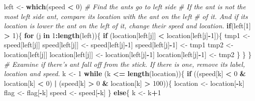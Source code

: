 \documentclass[]{article}
\newenvironment{Shaded}{\begin{snugshade}}{\end{snugshade}}
\newcommand{\KeywordTok}[1]{\textcolor[rgb]{0.13,0.29,0.53}{\textbf{#1}}}
\newcommand{\DecValTok}[1]{\textcolor[rgb]{0.00,0.00,0.81}{#1}}
\newcommand{\StringTok}[1]{\textcolor[rgb]{0.31,0.60,0.02}{#1}}
\newcommand{\CommentTok}[1]{\textcolor[rgb]{0.56,0.35,0.01}{\textit{#1}}}
\newcommand{\ControlFlowTok}[1]{\textcolor[rgb]{0.13,0.29,0.53}{\textbf{#1}}}
\newcommand{\OperatorTok}[1]{\textcolor[rgb]{0.81,0.36,0.00}{\textbf{#1}}}
\newcommand{\NormalTok}[1]{#1}
\begin{document}
\begin{Shaded}
\begin{Highlighting}[]
\NormalTok{      left <-}\StringTok{ }\KeywordTok{which}\NormalTok{(speed }\OperatorTok{<}\StringTok{ }\DecValTok{0}\NormalTok{) }\CommentTok{# Find the ants go to left side}
      \CommentTok{# If the ant is not the most left side ant, compare its location with the ant on the left }
      \CommentTok{# of it. And if its location is lower the ant on the left of it, change their speed and location.}
      \ControlFlowTok{if}\NormalTok{(left[}\DecValTok{1}\NormalTok{] }\OperatorTok{>}\StringTok{ }\DecValTok{1}\NormalTok{)\{}
        \ControlFlowTok{for}\NormalTok{ (j }\ControlFlowTok{in} \DecValTok{1}\OperatorTok{:}\KeywordTok{length}\NormalTok{(left))\{}
          \ControlFlowTok{if}\NormalTok{ (location[left[j]] }\OperatorTok{<}\StringTok{ }\NormalTok{location[left[j]}\OperatorTok{-}\DecValTok{1}\NormalTok{])\{}
\NormalTok{            tmp1 <-}\StringTok{ }\NormalTok{speed[left[j]]  }
\NormalTok{            speed[left[j]] <-}\StringTok{ }\NormalTok{speed[left[j]}\OperatorTok{-}\DecValTok{1}\NormalTok{]}
\NormalTok{            speed[left[j]}\OperatorTok{-}\DecValTok{1}\NormalTok{] <-}\StringTok{ }\NormalTok{tmp1}
\NormalTok{            tmp2 <-}\StringTok{ }\NormalTok{location[left[j]]  }
\NormalTok{            location[left[j]] <-}\StringTok{ }\NormalTok{location[left[j]}\OperatorTok{-}\DecValTok{1}\NormalTok{]}
\NormalTok{            location[left[j]}\OperatorTok{-}\DecValTok{1}\NormalTok{] <-}\StringTok{ }\NormalTok{tmp2}
\NormalTok{          \}}
\NormalTok{        \}}
\NormalTok{      \} }
      \CommentTok{# Examine if there's ant fall off from the stick. If there is one, remove its label, location and speed.}
\NormalTok{      k <-}\StringTok{ }\DecValTok{1}
      \ControlFlowTok{while}\NormalTok{ (k }\OperatorTok{<=}\StringTok{ }\KeywordTok{length}\NormalTok{(location))\{}
        \ControlFlowTok{if}\NormalTok{ ((speed[k] }\OperatorTok{<}\StringTok{ }\DecValTok{0} \OperatorTok{&}\StringTok{ }\NormalTok{location[k] }\OperatorTok{<}\StringTok{ }\DecValTok{0}\NormalTok{) }\OperatorTok{|}\StringTok{ }\NormalTok{(speed[k] }\OperatorTok{>}\StringTok{ }\DecValTok{0} \OperatorTok{&}\StringTok{ }\NormalTok{location[k] }\OperatorTok{>}\StringTok{ }\DecValTok{100}\NormalTok{))\{}
\NormalTok{          location <-}\StringTok{ }\NormalTok{location[}\OperatorTok{-}\NormalTok{k]}
\NormalTok{          flag <-}\StringTok{ }\NormalTok{flag[}\OperatorTok{-}\NormalTok{k]}
\NormalTok{          speed <-}\StringTok{ }\NormalTok{speed[}\OperatorTok{-}\NormalTok{k]}
\NormalTok{        \}}
        \ControlFlowTok{else}\NormalTok{\{}
\NormalTok{        k <-}\StringTok{ }\NormalTok{k}\OperatorTok{+}\DecValTok{1}

\end{Highlighting}
\end{Shaded}
\end{document}
